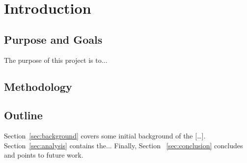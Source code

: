 \section{Introduction}
\label{sec:intro}



\subsection{Purpose and Goals}

The purpose of this project is to...
\vspace{2cm}



\subsection{Methodology}


\vspace{2cm}

\subsection{Outline}

Section~\ref{sec:background} covers some initial background of the [\dots]. Section~\ref{sec:analysis} contains the... Finally, Section ~\ref{sec:conclusion} concludes and points to future work.





